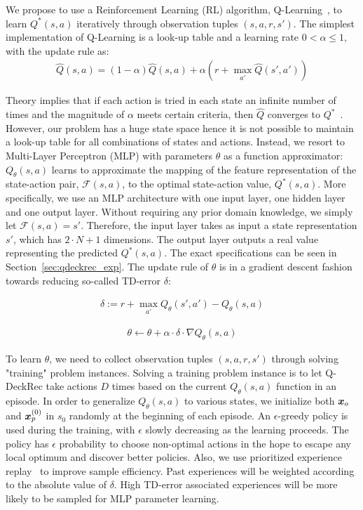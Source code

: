 We propose to use a Reinforcement Learning (RL) algorithm, Q-Learning~\cite{watkins1992q}, to learn $Q^*(s,a)$ iteratively through observation tuples $(s,a,r,s')$. The simplest implementation of Q-Learning is a look-up table and a learning rate $0 < \alpha \leq 1$, with the update rule as: 
\begin{align}
\hat{Q}(s,a) = (1 - \alpha) \hat{Q}(s,a) + \alpha (r + \max_{a'} \hat{Q}(s', a')) 
\label{eqn:qsa}
\end{align}

Theory implies that if each action is tried in each state an infinite number of times and the magnitude of $\alpha$ meets certain criteria, then $\hat{Q}$ converges to $Q^*$~\cite{bertsekas1989parallel}. However, our problem has a huge state space hence it is not possible to maintain a look-up table for all combinations of states and actions. Instead, we resort to Multi-Layer Perceptron (MLP) with parameters $\theta$ as a function approximator: $Q_\theta(s,a)$ learns to approximate the mapping of the feature representation of the state-action pair, $\mathcal{F}(s,a)$, to the optimal state-action value, $Q^*(s,a)$. More specifically, we use an MLP architecture with one input layer, one hidden layer and one output layer. Without requiring any prior domain knowledge, we simply let $\mathcal{F}(s,a)=s'$. Therefore, the input layer takes as input a state representation $s'$, which has ${2\cdot N+1}$ dimensions. The output layer outputs a real value  representing the predicted $Q^*(s,a)$. The exact specifications can be seen in Section~\ref{sec:qdeckrec_exp}. The update rule of $\theta$ is in a gradient descent fashion towards reducing so-called TD-error $\delta$:

\begin{align}
\delta := r + \max_{a'} Q_{\theta}(s', a') - Q_{\theta}(s,a)
\label{eqn:tderror}
\end{align}

\begin{align}
\theta \leftarrow \theta + \alpha \cdot \delta \cdot \nabla Q_\theta(s,a)
\label{eqn:updaterule}
\end{align}

To learn $\theta$, we need to collect  observation tuples $(s,a,r,s')$ through solving "training" problem instances. Solving a training problem instance is to let Q-DeckRec take actions $D$ times based on the current $Q_\theta(s,a)$ function in an episode. In order to generalize $Q_\theta(s,a)$ to various states, we initialize both $\boldsymbol{x}_o$ and $\boldsymbol{x}_p^{(0)}$ in $s_0$ randomly at the beginning of each episode. An $\epsilon$-greedy policy is used during the training, with $\epsilon$ slowly decreasing as the learning proceeds. The policy has $\epsilon$ probability to choose non-optimal actions in the hope to escape any local optimum and discover better policies. Also, we use prioritized experience replay~\cite{schaul2015prioritized} to improve sample efficiency. Past experiences will be weighted according to the absolute value of $\delta$. High TD-error associated experiences will be more likely to be sampled for MLP parameter learning. 


